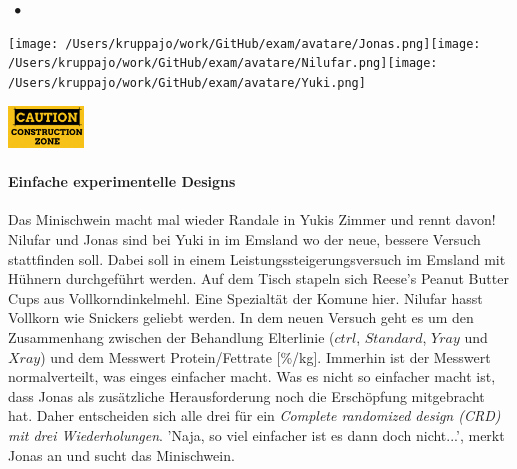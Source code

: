 \documentclass[a4paper, 9pt]{scrartcl}\usepackage[]{graphicx}\usepackage[]{xcolor}
\begin{document}
 
\ifcollection
\begin{flushright}
\tiny\vspace{-3Ex}
\textbf{\examinhaltstart}
\exammodulestatversuch $\;\bullet$
\exammodulebiostat
\vspace{-4Ex}
\end{flushright}
\begin{minipage}[t]{0.5\textwidth}
\texttt{[image: /Users/kruppajo/work/GitHub/exam/avatare/Jonas.png]}\hspace{-4mm}\texttt{[image: /Users/kruppajo/work/GitHub/exam/avatare/Nilufar.png]}\hspace{-4mm}\texttt{[image: /Users/kruppajo/work/GitHub/exam/avatare/Yuki.png]}
\end{minipage}
\begin{minipage}[t]{0.5\textwidth}
\hfill
\href{https://youtu.be/wJqsNV1hOW8}{\includegraphics[width = 2cm]{img/caution}}
\end{minipage}
\fi



\ifcollection
\paragraph{Einfache experimentelle Designs}
\fi

Das Minischwein macht mal wieder Randale in Yukis Zimmer und rennt davon! Nilufar und Jonas sind bei Yuki in im Emsland wo der neue, bessere Versuch stattfinden soll. Dabei soll in einem Leistungssteigerungsversuch im Emsland mit Hühnern durchgeführt werden. Auf dem Tisch stapeln sich Reese's Peanut Butter Cups aus Vollkorndinkelmehl. Eine Spezialtät der Komune hier. Nilufar hasst Vollkorn wie Snickers geliebt werden. In dem neuen Versuch geht es um den Zusammenhang zwischen der Behandlung Elterlinie ($ctrl$, $Standard$, $Yray$ und $Xray$) und dem Messwert Protein/Fettrate [\%/kg]. Immerhin ist der Messwert normalverteilt, was einges einfacher macht. Was es nicht so einfacher macht ist, dass Jonas als zusätzliche Herausforderung noch die Erschöpfung mitgebracht hat. Daher entscheiden sich alle drei für ein \textit{Complete randomized design (CRD) mit drei Wiederholungen}. 'Naja, so viel einfacher ist es dann doch nicht...', merkt Jonas an und sucht das Minischwein.\\
\end{document}
